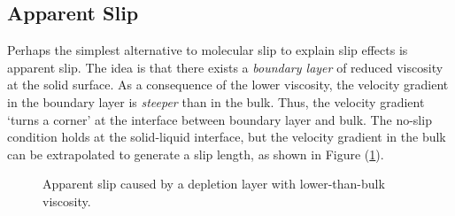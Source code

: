 \documentclass[12pt, a4paper, twoside, openright]{book}
\begin{document}
\subsection{Apparent Slip}

Perhaps the simplest alternative to molecular slip to explain slip effects is apparent slip. The idea is that there exists a \emph{boundary layer} of reduced viscosity at the solid surface. As a consequence of the lower viscosity, the velocity gradient in the boundary layer is \emph{steeper} than in the bulk. Thus, the velocity gradient `turns a corner' at the interface between boundary layer and bulk. The no-slip condition holds at the solid-liquid interface, but the velocity gradient in the bulk can be extrapolated to generate a slip length, as shown in Figure (\ref{depletion}).

\begin{figure}[ht]
\centering
{}
\caption{Apparent slip caused by a depletion layer with lower-than-bulk viscosity.} \label{depletion}
\end{figure}


\end{document}
